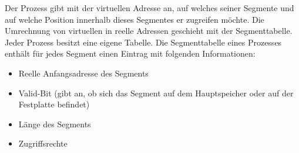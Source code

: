 \documentclass[12pt,a4paper]{article}
\begin{document}
		\newline
Der Prozess gibt mit der virtuellen Adresse an, auf welches seiner Segmente und auf welche Position innerhalb dieses Segmentes er zugreifen möchte. Die Umrechnung von virtuellen in reelle Adressen geschieht mit der Segmenttabelle. Jeder Prozess besitzt eine eigene Tabelle. Die Segmenttabelle eines Prozesses enthält für jedes Segment einen Eintrag mit folgenden Informationen:
	\begin{itemize}
		\item Reelle Anfangsadresse des Segments 
		\item Valid-Bit (gibt an, ob sich das Segment auf dem Hauptspeicher oder auf der Festplatte befindet)
		\item Länge des Segments
		\item Zugriffsrechte
	\end{itemize}
\end{document}
